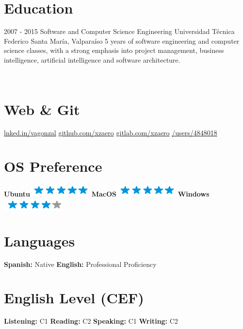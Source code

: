 \documentclass[]{friggeri-cv}
\begin{document}
\section{Education}
\begin{entrylist}
  \entry
    {2007 - 2015}
    {Software and Computer Science Engineering}
    {Universidad Técnica Federico Santa María, Valparaíso}
    {5\+ years of software engineering and computer science classes, with a strong emphasis into project management, business intelligence, artificial intelligence and software architecture.\\}
\end{entrylist}

\newpage

\begin{aside}
~
~
~
  \section{\faNewspaperO\space Web \& Git}
    \href{http://lnked.in/vagonzal}{\faLinkedin\space lnked.in/vagonzal}
    \href{https://github.com/xzaero}{\faGithub\space github.com/xzaero}
    \href{https://gitlab.com/xzaero}{\faGitlab\space gitlab.com/xzaero}
    \href{http://stackoverflow.com/users/4848018/xzaero}{\faStackOverflow\space /users/4848018}
    ~
  \section{OS Preference}
    \textbf{Ubuntu}\includegraphics[scale=0.40]{img/5stars.png}
    \textbf{MacOS}\includegraphics[scale=0.40]{img/5stars.png}
    \textbf{Windows}\includegraphics[scale=0.40]{img/4stars.png}
    ~
  \section{Languages}
    \textbf{Spanish:} Native
    \textbf{English:} Professional Proficiency
    ~
  \section{English Level (CEF)}
    \textbf{Listening:} C1
    \textbf{Reading:} C2
	\textbf{Speaking:} C1
	\textbf{Writing:} C2
    ~
\end{aside}
\end{document}
